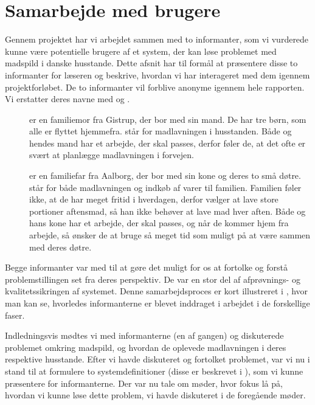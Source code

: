 \section{Samarbejde med brugere}
\label{sec:samarbejde}

Gennem projektet har vi arbejdet sammen med to informanter, som vi vurderede kunne være potentielle brugere af et system, der kan løse problemet med madspild i danske husstande. Dette afsnit har til formål at præsentere disse to informanter for læseren og beskrive, hvordan vi har interageret med dem igennem projektforløbet. De to informanter vil forblive anonyme igennem hele rapporten. Vi erstatter deres navne med \informantet{} og \informantto{}.

\begin{description}
\item[\Informantet{}] er en familiemor fra Gistrup, der bor med sin mand. De har tre børn, som alle er flyttet hjemmefra. \Informantet{} står for madlavningen i husstanden. Både \informantet{} og hendes mand har et arbejde, der skal passes, derfor føler de, at det ofte er svært at planlægge madlavningen i forvejen.

\item[\Informantto{}] er en familiefar fra Aalborg, der bor med sin kone og deres to små døtre. \Informantto{} står for både madlavningen og indkøb af varer til familien. Familien føler ikke, at de har meget fritid i hverdagen, derfor vælger \informantto{} at lave store portioner aftensmad, så han ikke behøver at lave mad hver aften. Både \informantto{} og hans kone har et arbejde, der skal passes, og når de kommer hjem fra arbejde, så ønsker de at bruge så meget tid som muligt på at være sammen med deres døtre.
\end{description}

Begge informanter var med til at gøre det muligt for os at fortolke og forstå problemstillingen set fra deres perspektiv. De var en stor del af afprøvnings- og kvalitetssikringen af systemet. Denne samarbejdsproces er kort illustreret i , hvor man kan se, hvorledes informanterne er blevet inddraget i arbejdet i de forskellige faser.

Indledningsvis mødtes vi med informanterne (en af gangen) og diskuterede problemet omkring madspild, og hvordan de oplevede madlavningen i deres respektive husstande. Efter vi havde diskuteret og fortolket problemet, var vi nu i stand til at formulere to systemdefinitioner (disse er beskrevet i ), som vi kunne præsentere for informanterne. Der var nu tale om møder, hvor fokus lå på, hvordan vi kunne løse dette problem, vi havde diskuteret i de foregående møder. 

